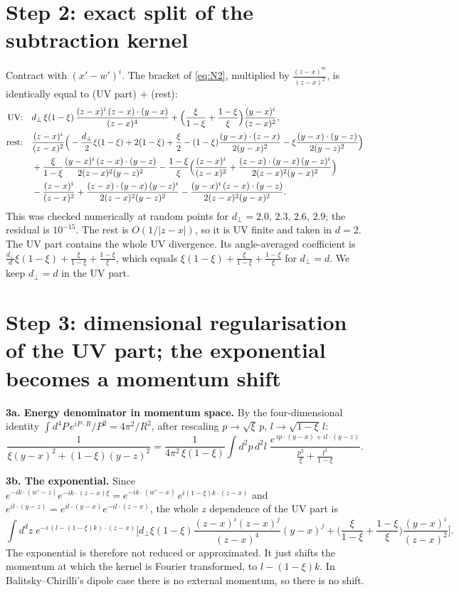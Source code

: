 \documentclass[10pt]{article}
\numberwithin{equation}{section}
\begin{document}
\section{Step 2: exact split of the subtraction kernel}
Contract with $(x'-w')^{i}$. The bracket of \eqref{eq:N2}, multiplied by $\frac{(z-x)^{m}}{(z-x)^{2}}$, is identically equal to (UV part) $+$ (rest):
\begin{align}
\text{UV:}\quad&d_{\perp}\,\xi(1-\xi)\,\frac{(z-x)^{i}\,(z-x)\cdot(y-x)}{(z-x)^{4}}+\Big(\frac{\xi}{1-\xi}+\frac{1-\xi}{\xi}\Big)\frac{(y-x)^{i}}{(z-x)^{2}},\\
\text{rest:}\quad&\frac{(z-x)^{i}}{(z-x)^{2}}\Big(-\frac{d_{\perp}}{2}\xi(1-\xi)+2(1-\xi)+\frac{\xi}{2}-(1-\xi)\frac{(y-x)\cdot(z-x)}{2(y-x)^{2}}-\xi\frac{(y-x)\cdot(y-z)}{2(y-z)^{2}}\Big)\notag\\
&+\frac{\xi}{1-\xi}\frac{(y-x)^{i}\,(z-x)\cdot(y-z)}{2(z-x)^{2}(y-z)^{2}}-\frac{1-\xi}{\xi}\Big(\frac{(z-x)^{i}}{(z-x)^{2}}+\frac{(z-x)\cdot(y-x)\,(y-z)^{i}}{2(z-x)^{2}(y-x)^{2}}\Big)\notag\\
&-\frac{(z-x)^{i}}{(z-x)^{2}}+\frac{(z-x)\cdot(y-x)\,(y-z)^{i}}{2(z-x)^{2}(y-z)^{2}}-\frac{(y-x)^{i}\,(z-x)\cdot(y-z)}{2(z-x)^{2}(y-x)^{2}} .
\end{align}
This was checked numerically at random points for $d_{\perp}=2.0,\,2.3,\,2.6,\,2.9$; the residual is $10^{-15}$. The rest is $O(1/|z-x|)$, so it is UV finite and taken in $d=2$. The UV part contains the whole UV divergence. Its angle-averaged coefficient is $\frac{d_{\perp}}{d}\xi(1-\xi)+\frac{\xi}{1-\xi}+\frac{1-\xi}{\xi}$, which equals $\xi(1-\xi)+\frac{\xi}{1-\xi}+\frac{1-\xi}{\xi}$ for $d_{\perp}=d$. We keep $d_{\perp}=d$ in the UV part.

\section{Step 3: dimensional regularisation of the UV part; the exponential becomes a momentum shift}
\textbf{3a. Energy denominator in momentum space.} By the four-dimensional identity $\int d^{4}P\,e^{iP\cdot R}/P^{2}=4\pi^{2}/R^{2}$, after rescaling $p\to\sqrt\xi\,p$, $l\to\sqrt{1-\xi}\,l$:
\begin{equation}
\frac{1}{\xi(y-x)^{2}+(1-\xi)(y-z)^{2}}=\frac{1}{4\pi^{2}\,\xi(1-\xi)}\int d^{2}p\,d^{2}l\;\frac{e^{\,ip\cdot(y-x)+il\cdot(y-z)}}{\frac{p^{2}}{\xi}+\frac{l^{2}}{1-\xi}} .
\end{equation}

\textbf{3b. The exponential.} Since $e^{-ik\cdot(w'-z)}e^{-ik\cdot(z-x)\xi}=e^{-ik\cdot(w'-x)}\,e^{i(1-\xi)k\cdot(z-x)}$ and $e^{il\cdot(y-z)}=e^{il\cdot(y-x)}e^{-il\cdot(z-x)}$, the whole $z$ dependence of the UV part is
\begin{equation}
\int d^{d}z\;e^{-i\,(l-(1-\xi)k)\cdot(z-x)}\Big[d_{\perp}\xi(1-\xi)\frac{(z-x)^{i}(z-x)^{j}}{(z-x)^{4}}(y-x)^{j}+\Big(\frac{\xi}{1-\xi}+\frac{1-\xi}{\xi}\Big)\frac{(y-x)^{i}}{(z-x)^{2}}\Big].
\end{equation}
The exponential is therefore not reduced or approximated. It just shifts the momentum at which the kernel is Fourier transformed, to $l-(1-\xi)k$. In Balitsky--Chirilli's dipole case there is no external momentum, so there is no shift.
\end{document}
